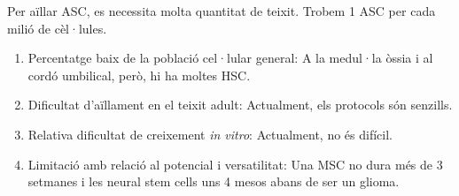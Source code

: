 Per aïllar ASC, es necessita molta quantitat de teixit. Trobem 1 ASC per cada milió de cèl·lules.

\begin{enumerate}
\item Percentatge baix de la població cel·lular general: A la medul·la òssia i al cordó umbilical, però, hi ha moltes HSC.
\item Dificultat d'aïllament en el teixit adult: Actualment, els protocols són senzills.
\item Relativa dificultat de creixement \textit{in vitro}: Actualment, no és difícil.
\item Limitació amb relació al potencial i versatilitat: Una MSC no dura més de 3 setmanes i les neural stem cells uns 4 mesos abans de ser un glioma.
\end{enumerate}